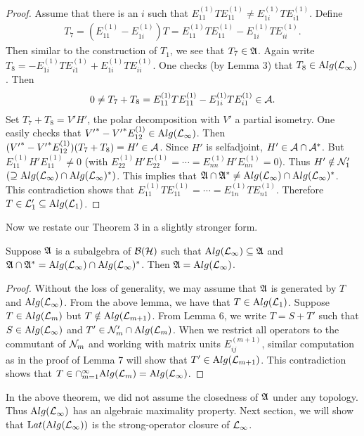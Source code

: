 \begin{proof}
Assume that there is an $i$ such that $E_{11}^{(1)}TE_{11}^{(1)}
\neq E_{1i}^{(1)}TE_{i1}^{(1)}$. Define
\begin{align*}
T_7= (E_{11}^{(1)} - E_{1i}^{(1)})T = E_{11}^{(1)}TE_{11}^{(1)} -
E_{1i}^{(1)}TE_{ii}^{(1)}.
\end{align*}
 Then similar to the construction of $T_1$, we see that $T_7\in\mathfrak A$. Again
write $T_{8} = - E_{1i}^{(1)}TE_{i1}^{(1)} +
E_{1i}^{(1)}TE_{ii}^{(1)}$. One checks (by Lemma 3) that $T_{8}
\in \mathrm Alg(\mathcal L_\infty)$. Then
\begin{align*}
0 \neq T_{7} + T_{8} = E_{11}^{(1)}TE_{11}^{(1)} -
E_{1i}^{(1)}TE_{i1}^{(1)} \in {\mathcal A}.
\end{align*}
Set $T_7+T_{8}=V'H'$, the polar decomposition with $V'$ a partial
isometry. One easily checks that ${V'}^{*} - {V'}^{*}E_{12}^{(1)}
\in \mathrm Alg(\mathcal L_\infty)$. Then $ ({V'}^{*} -
{V'}^{*}E_{12}^{(1)})(T_7+T_{8}) = H'  \in {\mathcal A}$. Since $H'$ is
selfadjoint, $H'\in\mathcal A\cap\mathcal A^*$. But $E_{11}^{(1)}H'E_{11}^{(1)} \neq
0$ (with $E_{22}^{(1)}H'E_{22}^{(1)} = \cdots =
E_{nn}^{(1)}H'E_{nn}^{(1)}=0$).
 Thus $H'\notin\mathcal N_1'$
$(\supseteq\mathrm Alg(\mathcal L_\infty)\cap\mathrm Alg(\mathcal L_\infty)^*)$. This implies that
$\mathfrak A\cap\mathfrak A^*\neq \mathrm Alg(\mathcal L_\infty)\cap\mathrm Alg(\mathcal L_\infty)^*$. This
contradiction shows that  $E_{11}^{(1)}TE_{11}^{(1)} = \cdots =
E_{1n}^{(1)}TE_{n1}^{(1)}$. Therefore $T \in {\mathcal L}_{1}'\subseteq\mathrm Alg(\mathcal L_1)$.
\end{proof}

Now we restate our Theorem 3 in a slightly stronger form.

\begin{theorem}
Suppose $\mathfrak A$ is a
subalgebra of $\mathcal B(\mathcal H)$ such that $\mathrm Alg(\mathcal L_\infty)\subseteq\mathfrak A$ and
$\mathfrak A\cap\mathfrak A^*=\mathrm Alg(\mathcal L_\infty)\cap\mathrm Alg(\mathcal L_\infty)^*$. Then
$\mathfrak A=\mathrm Alg(\mathcal L_\infty)$.
\end{theorem}

\begin{proof}
Without the loss of generality, we
may assume that $\mathfrak A$ is generated by $T$ and $\mathrm Alg(\mathcal L_\infty)$.
From the above lemma, we have that $T\in\mathrm Alg(\mathcal L_1)$. Suppose
$T\in\mathrm Alg(\mathcal L_m)$ but $T\notin\mathrm Alg(\mathcal L_{m+1})$. From Lemma 6, we
write $T=S+T'$ such that $S\in\mathrm Alg(\mathcal L_\infty)$ and
$T'\in\mathcal N_m'\cap\mathrm Alg(\mathcal L_m)$. When we restrict all operators to
the commutant of $\mathcal N_m$ and working with matrix units
$E_{ij}^{(m+1)}$, similar computation as in the proof of Lemma 7
will show that $T'\in\mathrm Alg(\mathcal L_{m+1})$. This contradiction shows
that $T\in\cap_{m=1}^\infty\mathrm Alg(\mathcal L_m)=\mathrm Alg(\mathcal L_\infty)$.
\end{proof}


In the above theorem, we did not assume the closedness of $\mathfrak A$
under any topology. Thus $\mathrm Alg(\mathcal L_\infty)$ has an algebraic
maximality property. Next section, we will show that
$\mathrm Lat(\mathrm Alg(\mathcal L_\infty))$ is the strong-operator closure of
$\mathcal L_\infty$. %


\vskip20pt















